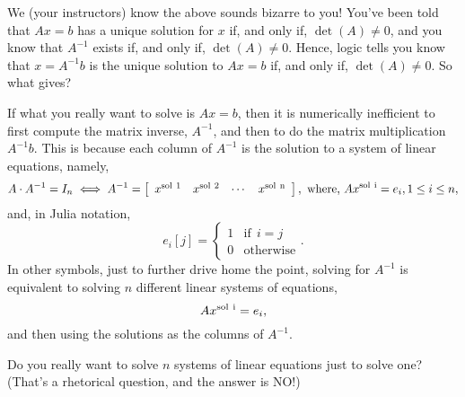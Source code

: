 We (your instructors) know the above sounds bizarre to you! You've been told that $Ax=b$ has a unique solution for $x$ if, and only if, $\det(A) \neq 0$, and you know that $A^{-1}$ exists if, and only if, $\det(A)\neq 0$. Hence, logic tells you know that $x=A^{-1}b$ is the unique solution to $Ax=b$ if, and only if, $\det(A)\neq 0$. So what gives? \\

\begin{tcolorbox}[sharp corners, colback=green!30, colframe=green!80!blue, title=\textbf{\large (Optional Read) Theory vs Reality: I}]
If what you really want to solve is $A x = b$, then it is numerically inefficient to first compute the matrix inverse, $A^{-1}$, and then to do the matrix multiplication $A^{-1} b$. This is because each column of $A^{-1}$ is the solution to a system of linear equations, namely,
\begin{equation}
\label{eq:SolveForInvA}
    A \cdot A^{-1} = I_n \iff A^{-1} = \left[\begin{array}{cccc} x^{\rm sol~1} & x^{\rm sol~2} & \cdots & x^{\rm sol~n}  \end{array} \right], \text{ where, }A x^{\rm sol~i} = e_i, 1 \le i \le n,
\end{equation}
and, in Julia notation, 
$$e_i[j]=\begin{cases} 1 &  \text{if}~~i = j \\ 0 & \text{otherwise}\end{cases}.$$
In other symbols, just to further drive home the point, solving for $A^{-1}$ is equivalent to solving $n$ different linear systems of equations, 
$$A x^{\rm sol~i} = e_i,$$ 
and then using the solutions as the columns of $A^{-1}$. 
\end{tcolorbox}
\vspace*{1cm}

Do you really want to solve $n$ systems of linear equations just to solve one? (That's a rhetorical question, and the answer is NO!)\\ 


